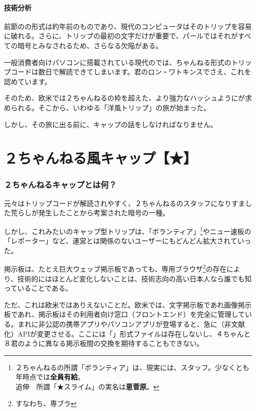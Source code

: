 \documentclass[lualatex, tate, landscape, paper=a4]{jlreq}
\newcommand{\yokoB}[1]{\hspace{0.1em}\hbox{\yoko \resizebox{1em}{0.66em}{#1}}\hspace{0.1em}}
\newcommand{\yokoY}[1]{\hbox{\yoko {\small #1}}\hspace{0.3em}}
\begin{document}
\eject
\subsection{技術分析}

前節の\FOXsan の形式は約\yokoB{20}年前のものであり、現代のコンピュータはそのトリップを容易に破れる。さらに、トリップの最初の\hbox{}文字だけが重要で、パールではそれがすべての暗号とみなされるため、さらなる欠陥がある。

一般消費者向けパソコンに搭載されている現代の\yokoB{GPU}では、\hbox{}ちゃんねる形式のトリップコードは数日で解読できてしまいます。\hbox{}君のロン・ワトキンスでさえ、これを認めています。

そのため、欧米では２ちゃんねるの枠を超えた、より強力なハッシュようにが求められる。そこから、いわゆる「洋風トリップ」の旅が始まった。

しかし、その旅に出る前に、キャップの話をしなければなりません。

\eject
\part{２ちゃんねる風キャップ【★】}
\section{２ちゃんねるキャップとは何？}
元々はトリップコードが解読されやすく、２ちゃんねるのスタッフになりすました荒らしが発生したことから考案された暗号の一種。

しかし、これみたいのキャップ型トリップは、「ボランティア」\footnote{２ちゃんねるの所謂「ボランティア」は、現実には、スタッフ。少なくとも\yokoY{{\tiny 2015}}年時点では{\bfseries 全員有給}。\\追伸　所謂「★スライム」の実名は{\bfseries 恵菅原}。}やニュー速板の「レポーター」など、運営とは関係のないユーザーにもどんどん拡大されていった。

掲示板は、たとえ巨大ウェッブ掲示板であっても、専用ブラウザ\footnote{すなわち、専ブラ}の存在により、技術的にはほとんど変化しないことは、技術志向の高い日本人なら誰でも知っていることである。

ただ、これは欧米ではありえないことだ。欧米では、文字掲示板であれ画像掲示板であれ、掲示板はその利用者向け窓口（フロントエンド）を完全に管理している。まれに非公認の携帯アプリやパソコンアプリが登場すると、急に（非文献化）APIが変更させる。ここには「\yokoB{dat}」形式ファイルは存在しないし、４ちゃんと８君のように異なる掲示板間の交換を期待することもできない。
\end{document}
